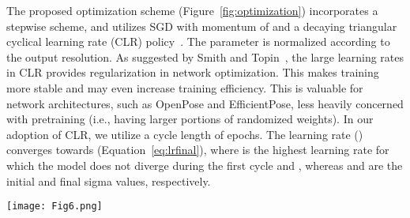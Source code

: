 The proposed optimization scheme (Figure~\ref{fig:optimization}) incorporates a stepwise  scheme, and utilizes SGD with momentum of  and a decaying triangular cyclical learning rate (CLR) policy~\cite{smith2017cyclical}. The  parameter is normalized according to the output resolution. As suggested by Smith and Topin~\cite{smith2019super}, the large learning rates in CLR provides regularization in network optimization. This makes training more stable and may even increase training efficiency. This is valuable for network architectures, such as OpenPose and EfficientPose, less heavily concerned with pretraining (i.e., having larger portions of randomized weights). In our adoption of CLR, we utilize a cycle length of  epochs. The learning rate () converges towards  (Equation~\ref{eq:lrfinal}), where  is the highest learning rate for which the model does not diverge during the first cycle and , whereas  and  are the initial and final sigma values, respectively.



\begin{figure*}
\begin{center}
\texttt{[image: Fig6.png]}
\caption{Optimization scheme displaying learning rates  and  values corresponding to the training of EfficientPose II over  epochs}
\label{fig:optimization}       
\end{center}
\end{figure*}



